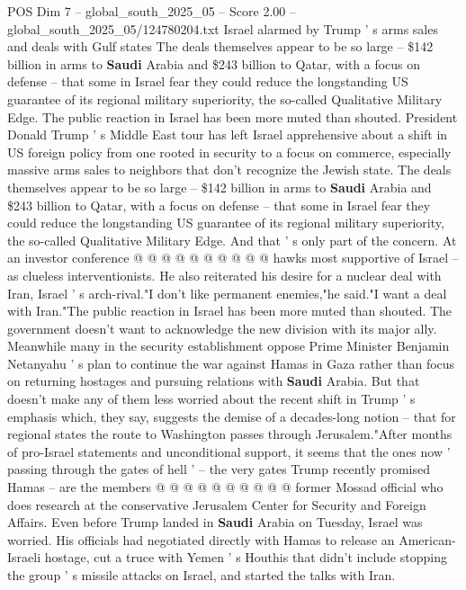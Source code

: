 \begin{textsample}{POS Dim 7 – global\_south\_2025\_05 – Score 2.00 – global\_south\_2025\_05/124780204.txt}  \label{ex:f7_pos_233}
Israel alarmed by Trump ' s arms sales and deals with Gulf states The deals themselves appear to be so large -- \$142 billion in arms to \textbf{Saudi} Arabia and \$243 billion to Qatar, with a focus on defense -- that some in Israel fear they could reduce the longstanding US guarantee of its regional military superiority, the so-called Qualitative Military Edge.
The public reaction in Israel has been more muted than shouted.
President Donald Trump ' s Middle East tour has left Israel apprehensive about a shift in US foreign policy from one rooted in security to a focus on commerce, especially massive arms sales to neighbors that don't recognize the Jewish state.
The deals themselves appear to be so large -- \$142 billion in arms to \textbf{Saudi} Arabia and \$243 billion to Qatar, with a focus on defense -- that some in Israel fear they could reduce the longstanding US guarantee of its regional military superiority, the so-called Qualitative Military Edge.
And that ' s only part of the concern.
At an investor conference @ @ @ @ @ @ @ @ @ @ hawks most supportive of Israel -- as clueless interventionists.
He also reiterated his desire for a nuclear deal with Iran, Israel ' s arch-rival."I don't like permanent enemies,"he said."I want a deal with Iran."The public reaction in Israel has been more muted than shouted.
The government doesn't want to acknowledge the new division with its major ally.
Meanwhile many in the security establishment oppose Prime Minister Benjamin Netanyahu ' s plan to continue the war against Hamas in Gaza rather than focus on returning hostages and pursuing relations with \textbf{Saudi} Arabia.
But that doesn't make any of them less worried about the recent shift in Trump ' s emphasis which, they say, suggests the demise of a decades-long notion -- that for regional states the route to Washington passes through Jerusalem."After months of pro-Israel statements and unconditional support, it seems that the ones now ' passing through the gates of hell ' -- the very gates Trump recently promised Hamas -- are the members @ @ @ @ @ @ @ @ @ @ former Mossad official who does research at the conservative Jerusalem Center for Security and Foreign Affairs.
Even before Trump landed in \textbf{Saudi} Arabia on Tuesday, Israel was worried.
His officials had negotiated directly with Hamas to release an American-Israeli hostage, cut a truce with Yemen ' s Houthis that didn't include stopping the group ' s missile attacks on Israel, and started the talks with Iran.

\end{textsample}
